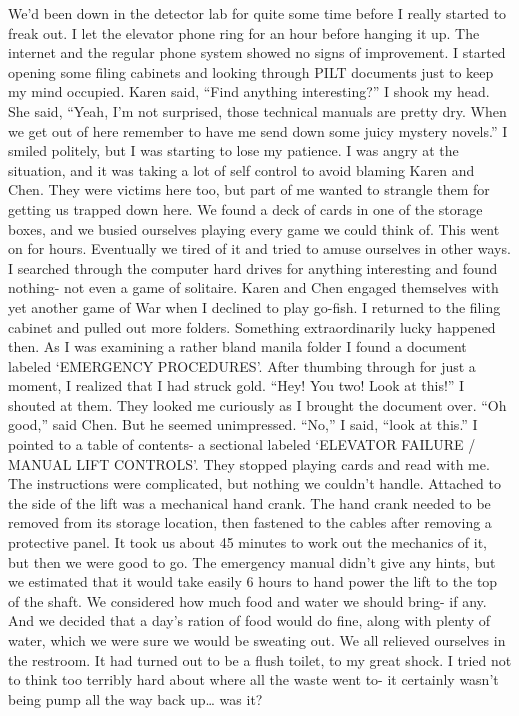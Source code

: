 \documentclass[a4paper]{article}
\begin{document}
We’d been down in the detector lab for quite some time before I really started to freak out. I let the elevator phone ring for an hour before hanging it up. The internet and the regular phone system showed no signs of improvement. I started opening some filing cabinets and looking through PILT documents just to keep my mind occupied.
Karen said, “Find anything interesting?”
I shook my head. She said, “Yeah, I’m not surprised, those technical manuals are pretty dry. When we get out of here remember to have me send down some juicy mystery novels.”
I smiled politely, but I was starting to lose my patience. I was angry at the situation, and it was taking a lot of self control to avoid blaming Karen and Chen. They were victims here too, but part of me wanted to strangle them for getting us trapped down here.
We found a deck of cards in one of the storage boxes, and we busied ourselves playing every game we could think of. This went on for hours. Eventually we tired of it and tried to amuse ourselves in other ways. I searched through the computer hard drives for anything interesting and found nothing- not even a game of solitaire.
Karen and Chen engaged themselves with yet another game of War when I declined to play go-fish.
I returned to the filing cabinet and pulled out more folders. Something extraordinarily lucky happened then. As I was examining a rather bland manila folder I found a document labeled ‘EMERGENCY PROCEDURES’. After thumbing through for just a moment, I realized that I had struck gold.
“Hey! You two! Look at this!” I shouted at them. They looked me curiously as I brought the document over.
“Oh good,” said Chen. But he seemed unimpressed.
“No,” I said, “look at this.”
I pointed to a table of contents- a sectional labeled ‘ELEVATOR FAILURE / MANUAL LIFT CONTROLS’. They stopped playing cards and read with me.
The instructions were complicated, but nothing we couldn’t handle. Attached to the side of the lift was a mechanical hand crank. The hand crank needed to be removed from its storage location, then fastened to the cables after removing a protective panel. It took us about 45 minutes to work out the mechanics of it, but then we were good to go.
The emergency manual didn’t give any hints, but we estimated that it would take easily 6 hours to hand power the lift to the top of the shaft. We considered how much food and water we should bring- if any. And we decided that a day’s ration of food would do fine, along with plenty of water, which we were sure we would be sweating out.
We all relieved ourselves in the restroom. It had turned out to be a flush toilet, to my great shock. I tried not to think too terribly hard about where all the waste went to- it certainly wasn’t being pump all the way back up… was it?
\end{document}
